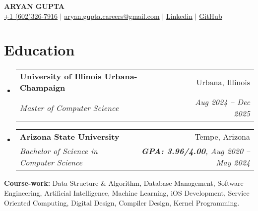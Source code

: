 \documentclass[letterpaper,11pt]{article}
\makeatletter
\newcommand{\resumeEducationHeading}[5]{
  \vspace{-2pt}\item
    \begin{tabular*}{0.97\textwidth}[t]{l@{\extracolsep{\fill}}r}
      \textbf{#1} & #2 \\
      \textit{\small#3} & \textit{\small #4#5} \\
    \end{tabular*}\vspace{-5pt}
}
\newcommand{\resumeSubHeadingListStart}{\begin{itemize}[leftmargin=0.15in, label={}]}
\newcommand{\resumeSubHeadingListEnd}{\end{itemize}}
\makeatother
\begin{document}
\begin{center}
  \textbf{\Huge \scshape ARYAN GUPTA} \\ \vspace{3pt} 
  \small
  \faMobile \hspace{.5pt} \href{tel:6023267916}{+1 (602)326-7916}
  $|$
  \faAt \hspace{.5pt} \href{mailto:aryan.gupta.careers@gmail.com}{aryan.gupta.careers@gmail.com}
  $|$
  \faLinkedinSquare \hspace{.5pt} \href{https://www.linkedin.com/in/agupt295}{{\color{blue}Linkedin}}
  $|$
  \faGithub \hspace{.5pt} \href{https://github.com/agupt295}{{\color{blue}GitHub}}
\end{center}

\section{\color[rgb]{0.25, 0.41, 0.88} Education}
\resumeSubHeadingListStart
  \resumeEducationHeading
    {University of Illinois Urbana-Champaign}{Urbana, Illinois}
    {Master of Computer Science}{Aug 2024 -- Dec 2025}{}{}
\resumeSubHeadingListEnd
\vspace{-0.35cm} %
\resumeSubHeadingListStart
  \resumeEducationHeading
    {Arizona State University}{Tempe, Arizona}
    {Bachelor of Science in Computer Science}{\textbf{GPA: 3.96/4.00}}{, Aug 2020 -- May 2024}{}
\resumeSubHeadingListEnd

  \resumeSubHeadingListStart
    \small{\item{
        \textbf{Course-work:}{ Data-Structure \& Algorithm, Database Management, Software Engineering, Artificial Intelligence, Machine Learning, iOS Development, Service Oriented Computing, Digital Design, Compiler Design, Kernel Programming.} \\ \vspace{3pt}
    }}
  \resumeSubHeadingListEnd

\end{document}
